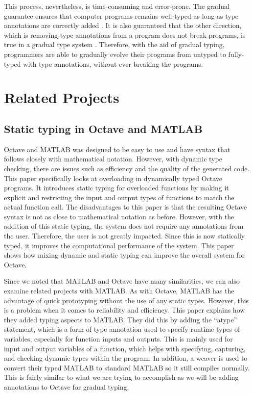 This process, nevertheless, is time-consuming and error-prone. The gradual guarantee ensures that computer programs remains well-typed as long as type annotations are correctly added \cite{siek2015refined}. It is also guaranteed that the other direction, which is removing type annotations from a program does not break programs, is true in a gradual type system \cite{siek2015refined}. Therefore, with the aid of gradual typing, programmers are able to gradually evolve their programs from untyped to fully-typed with type annotations, without ever breaking the programs.

\section{Related Projects}
\subsection{Static typing in Octave and MATLAB}
Octave and MATLAB was designed to be easy to use and have syntax that follows closely with mathematical notation. However, with dynamic type checking, there are issues such as efficiency and the quality of the generated code. This paper \cite{olmos2003turning} specifically looks at overloading in dynamically typed Octave programs. It introduces static typing for overloaded functions by making it explicit and restricting the input and output types of functions to match the actual function call. The disadvantages to this paper is that the resulting Octave syntax is not as close to mathematical notation as before. However, with the addition of this static typing, the system does not require any annotations from the user. Therefore, the user is not greatly impacted. Since this is now statically typed, it improves the computational performance of the system. This paper shows how mixing dynamic and static typing can improve the overall system for Octave.

Since we noted that MATLAB and Octave have many similarities, we can also examine related projects with MATLAB. As with Octave, MATLAB has the advantage of quick prototyping without the use of any static types. However, this is a problem when it comes to reliability and efficiency. This paper \cite{hendren2011typing} explains how they added typing aspects to MATLAB. They did this by adding the ``atype'' statement, which is a form of type annotation used to specify runtime types of variables, especially for function inputs and outputs. This is mainly used for input and output variables of a function, which helps with specifying, capturing, and checking dynamic types within the program. In addition, a weaver is used to convert their typed MATLAB to standard MATLAB so it still compiles normally. This is fairly similar to what we are trying to accomplish as we will be adding annotations to Octave for gradual typing.

